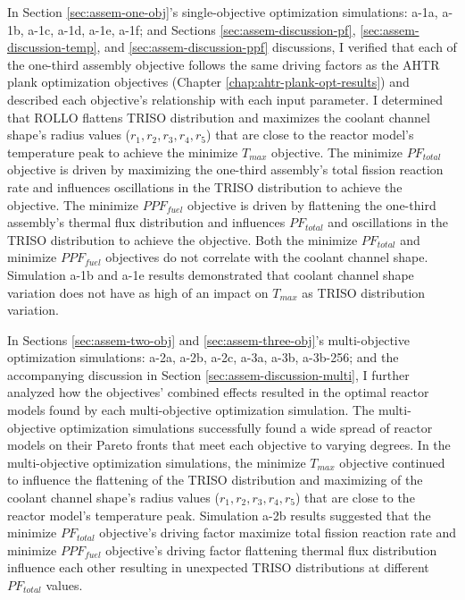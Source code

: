 In Section \ref{sec:assem-one-obj}'s single-objective optimization simulations: 
a-1a, a-1b, a-1c, a-1d, a-1e, a-1f; and Sections \ref{sec:assem-discussion-pf}, 
\ref{sec:assem-discussion-temp}, and \ref{sec:assem-discussion-ppf} discussions,    
I verified that each of the one-third assembly objective follows the same driving 
factors as the \gls{AHTR} plank optimization objectives (Chapter 
\ref{chap:ahtr-plank-opt-results}) and described each objective's relationship with 
each input parameter. 
I determined that \gls{ROLLO} flattens TRISO distribution and maximizes the coolant 
channel shape's radius values ($r_1, r_2, r_3, r_4, r_5$) that are close to the 
reactor model's temperature peak to achieve the minimize $T_{max}$ objective. 
The minimize $PF_{total}$ objective is driven by maximizing the one-third assembly's 
total fission reaction rate and influences oscillations in the TRISO distribution to 
achieve the objective. 
The minimize $PPF_{fuel}$ objective is driven by flattening the one-third assembly's 
thermal flux distribution and influences $PF_{total}$ and oscillations in the TRISO 
distribution to achieve the objective. 
Both the minimize $PF_{total}$ and minimize $PPF_{fuel}$ objectives do not correlate
with the coolant channel shape. 
Simulation a-1b and a-1e results demonstrated that coolant channel shape variation does 
not have as high of an impact on $T_{max}$ as \gls{TRISO} distribution variation.

In Sections \ref{sec:assem-two-obj} and \ref{sec:assem-three-obj}'s multi-objective 
optimization simulations: a-2a, a-2b, a-2c, a-3a, a-3b, a-3b-256; and the accompanying 
discussion in Section \ref{sec:assem-discussion-multi}, I further 
analyzed how the objectives' combined effects resulted in the optimal reactor models 
found by each multi-objective optimization simulation. 
The multi-objective optimization simulations successfully found a wide spread of 
reactor models on their Pareto fronts that meet each objective to varying degrees. 
In the multi-objective optimization simulations, the minimize $T_{max}$ objective 
continued to influence the flattening of the TRISO distribution and maximizing of 
the coolant channel shape's radius values ($r_1, r_2, r_3, r_4, r_5$) that are close 
to the reactor model's temperature peak. 
Simulation a-2b results suggested that the minimize $PF_{total}$ 
objective's driving factor maximize total fission reaction rate and 
minimize $PPF_{fuel}$ objective's driving factor flattening thermal flux distribution 
influence each other resulting in unexpected TRISO distributions at different 
$PF_{total}$ values. 

